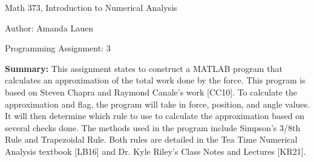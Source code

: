 \documentclass{article}
\begin{document}

\large

{\Large Math 373, Introduction to Numerical Analysis}

\begin{center}
{\Large Author: \hfill Amanda Lauen} %
\end{center}
\par \medskip \par
{\Large Programming Assignment: 3} 
\par \bigskip \par

{\bf Summary:} {\color{black} This assignment states to construct a MATLAB program that calculates an approximation of the total work done by the force.  This program is based on Steven Chapra and Raymond Canale’s work [CC10].  To calculate the approximation and flag, the program will take in force, position, and angle values. It will then determine which rule to use to calculate the approximation based on several checks done.  The methods used in the program include Simpson’s 3/8th Rule and Trapezoidal Rule.  Both rules are detailed in the Tea Time Numerical Analysis textbook [LB16] and Dr. Kyle Riley’s Class Notes and Lectures [KR21].} 
\par \bigskip \par
\end{document}

